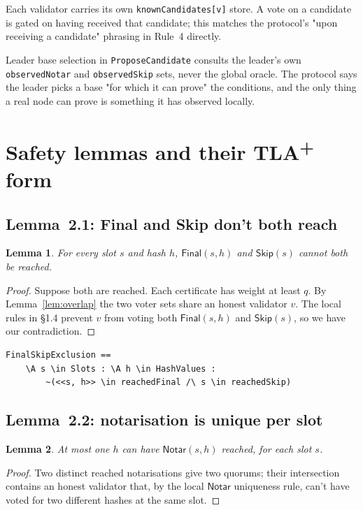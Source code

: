 \documentclass[11pt,a4paper]{article}
\newcommand{\Notar}{\mathsf{Notar}}
\newcommand{\Skip}{\mathsf{Skip}}
\newcommand{\Final}{\mathsf{Final}}
\newtheorem{lemma}{Lemma}
\begin{document}
Each validator carries its own \verb|knownCandidates[v]| store. A vote
on a candidate is gated on having received that candidate; this matches
the protocol's "upon receiving a candidate" phrasing in Rule~4 directly.

Leader base selection in \verb|ProposeCandidate| consults the leader's
own \verb|observedNotar| and \verb|observedSkip| sets, never the global
oracle. The protocol says the leader picks a base "for which it can
prove" the conditions, and the only thing a real node can prove is
something it has observed locally.

\section{Safety lemmas and their TLA\textsuperscript{+} form}

\subsection{Lemma~2.1: Final and Skip don't both reach}

\begin{lemma}\label{lem:fs}
For every slot $s$ and hash $h$, $\Final(s,h)$ and $\Skip(s)$ cannot
both be reached.
\end{lemma}
\begin{proof}
Suppose both are reached. Each certificate has weight at least $q$.
By Lemma~\ref{lem:overlap} the two voter sets share an honest validator
$v$. The local rules in §1.4 prevent $v$ from voting both $\Final(s,h)$
and $\Skip(s)$, so we have our contradiction.
\end{proof}

\begin{lstlisting}
FinalSkipExclusion ==
    \A s \in Slots : \A h \in HashValues :
        ~(<<s, h>> \in reachedFinal /\ s \in reachedSkip)
\end{lstlisting}

\subsection{Lemma~2.2: notarisation is unique per slot}

\begin{lemma}\label{lem:un}
At most one $h$ can have $\Notar(s,h)$ reached, for each slot $s$.
\end{lemma}
\begin{proof}
Two distinct reached notarisations give two quorums; their
intersection contains an honest validator that, by the local
$\Notar$ uniqueness rule, can't have voted for two different hashes
at the same slot.
\end{proof}
\end{document}
